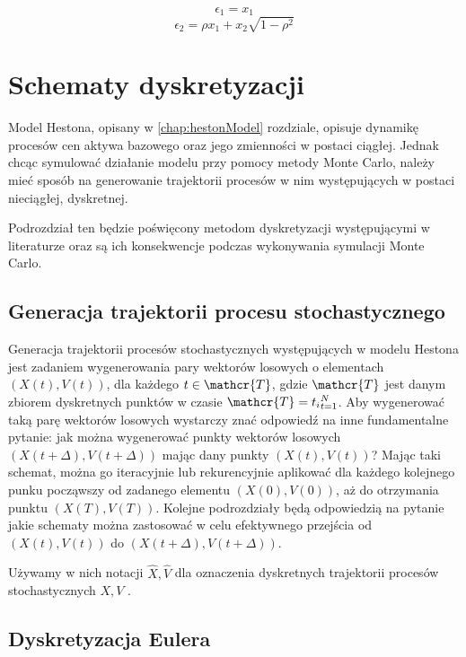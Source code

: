 \documentclass{pracamgr}
\begin{document}
\begin{equation}
  \epsilon_1 = x_1
\end{equation}
\begin{equation}
  \epsilon_2 = \rho x_1 + x_2 \sqrt{1-\rho^2}
\end{equation}



\section{Schematy dyskretyzacji}


Model Hestona, opisany w \ref{chap:hestonModel} rozdziale, opisuje dynamikę procesów cen aktywa 
bazowego oraz jego zmienności w postaci ciągłej.
Jednak chcąc symulować działanie modelu przy pomocy metody Monte Carlo, należy mieć sposób na generowanie trajektorii procesów w nim występujących w postaci nieciągłej, dyskretnej. 

Podrozdział ten będzie poświęcony metodom dyskretyzacji występującymi w literaturze oraz są ich konsekwencje podczas wykonywania symulacji Monte Carlo.


\subsection{Generacja trajektorii procesu stochastycznego}
Generacja trajektorii procesów stochastycznych występujących w modelu Hestona jest zadaniem wygenerowania pary wektorów 
losowych o elementach $(X(t), V(t))$, dla każdego $t \in \mathcr{T}$, gdzie $\mathcr{T}$ jest danym zbiorem dyskretnych punktów w czasie $\mathcr{T}  = {t_i}^N_{t=1}$. Aby wygenerować taką parę wektorów losowych wystarczy znać odpowiedź na inne fundamentalne pytanie: jak można wygenerować punkty wektorów losowych $(X(t+ \Delta), V(t+ \Delta))$
mając dany punkty $(X(t), V(t))$? Mając taki schemat, można go iteracyjnie lub rekurencyjnie aplikować dla każdego kolejnego punku począwszy od zadanego elementu $(X(0), V(0))$, aż do otrzymania punktu $(X(T), V(T))$.
Kolejne podrozdziały będą odpowiedzią na pytanie jakie schematy można zastosować w celu efektywnego przejścia od $(X(t), V(t))$ do $(X(t+ \Delta), V(t+ \Delta))$.

Używamy w nich notacji $\hat{X}, \hat{V}$ dla oznaczenia dyskretnych trajektorii procesów stochastycznych $X, V$ .

\subsection{Dyskretyzacja Eulera}
\end{document}

